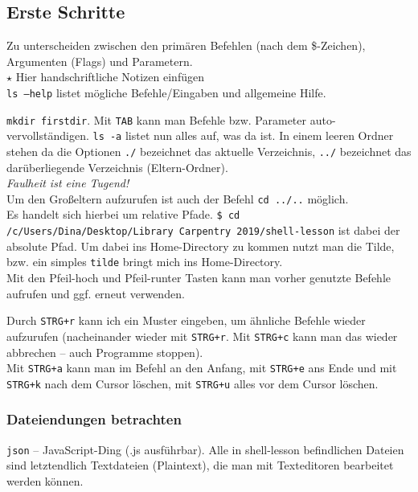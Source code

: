 \documentclass[11pt, a4paper, german]{article}
\begin{document}
\subsection{Erste Schritte}
Zu unterscheiden zwischen den primären Befehlen (nach dem \$-Zeichen), Argumenten (Flags) und Parametern.\\ 
$\star$ Hier handschriftliche Notizen einfügen\\

\noindent\texttt{ls --help} listet mögliche Befehle/Eingaben und allgemeine Hilfe. 

\noindent\texttt{mkdir firstdir}. Mit \texttt{TAB} kann man Befehle bzw. Parameter auto-vervollständigen. \texttt{ls -a} listet nun alles auf, was da ist. In einem leeren Ordner stehen da die Optionen \texttt{./} bezeichnet das aktuelle Verzeichnis, \texttt{../} bezeichnet das darüberliegende Verzeichnis (Eltern-Ordner).\\ 

\emph{Faulheit ist eine Tugend!}\\

\noindent Um den Großeltern aufzurufen ist auch der Befehl \texttt{cd ../..} möglich.\\

\noindent Es handelt sich hierbei um relative Pfade. \texttt{\$ cd /c/Users/Dina/Desktop/Library Carpentry 2019/shell-lesson} ist dabei der absolute Pfad. Um dabei ins Home-Directory zu kommen nutzt man die Tilde, bzw. ein simples \texttt{tilde} bringt mich ins Home-Directory.\\

Mit den Pfeil-hoch und Pfeil-runter Tasten kann man vorher genutzte Befehle aufrufen und ggf. erneut verwenden.  

Durch \texttt{STRG+r} kann ich ein Muster eingeben, um ähnliche Befehle wieder aufzurufen (nacheinander wieder mit \texttt{STRG+r}. Mit \texttt{STRG+c} kann man das wieder abbrechen -- auch Programme stoppen).\\

\noindent Mit \texttt{STRG+a} kann man im Befehl an den Anfang, mit \texttt{STRG+e} ans Ende und mit \texttt{STRG+k} nach dem Cursor löschen, mit \texttt{STRG+u} alles vor dem Cursor löschen.\\

\subsubsection{Dateiendungen betrachten}
\texttt{json} -- JavaScript-Ding (.js ausführbar). Alle in shell-lesson befindlichen Dateien sind letztendlich Textdateien (Plaintext), die man mit Texteditoren bearbeitet werden können. 
\end{document}
